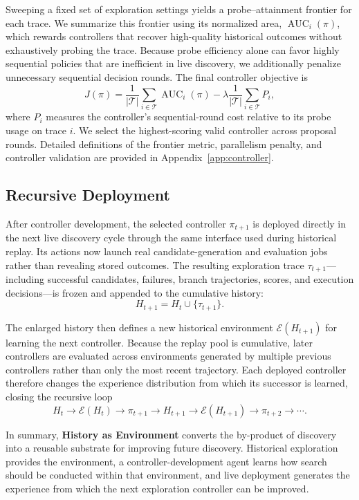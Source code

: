 Sweeping a fixed set of exploration settings yields a probe--attainment
frontier for each trace. We summarize this frontier using its normalized area,
$\operatorname{AUC}_i(\pi)$, which rewards controllers that recover high-quality
historical outcomes without exhaustively probing the trace. Because probe
efficiency alone can favor highly sequential policies that are inefficient in
live discovery, we additionally penalize unnecessary sequential decision
rounds. The final controller objective is
\begin{equation}
    J(\pi)
    =
    \frac{1}{|\mathcal{T}|}
    \sum_{i\in\mathcal{T}}
    \operatorname{AUC}_i(\pi)
    -
    \lambda
    \frac{1}{|\mathcal{T}|}
    \sum_{i\in\mathcal{T}}
    P_i,
    \label{eq:controller-objective}
\end{equation}
where $P_i$ measures the controller's sequential-round cost relative to its
probe usage on trace $i$. We select the highest-scoring valid controller across
proposal rounds. Detailed definitions of the frontier metric, parallelism
penalty, and controller validation are provided in Appendix~\ref{app:controller}.


\subsection{Recursive Deployment}
\label{sec:recursive-deployment}

After controller development, the selected controller $\pi_{t+1}$ is deployed
directly in the next live discovery cycle through the same interface used
during historical replay. Its actions now launch real candidate-generation and
evaluation jobs rather than revealing stored outcomes. The resulting
exploration trace $\tau_{t+1}$---including successful candidates, failures,
branch trajectories, scores, and execution decisions---is frozen and appended
to the cumulative history:
\begin{equation}
    H_{t+1}
    =
    H_t \cup \{\tau_{t+1}\}.
\end{equation}

The enlarged history then defines a new historical environment
$\mathcal{E}(H_{t+1})$ for learning the next controller. Because the replay pool
is cumulative, later controllers are evaluated across environments generated
by multiple previous controllers rather than only the most recent trajectory.
Each deployed controller therefore changes the experience distribution from
which its successor is learned, closing the recursive loop
\begin{equation}
    H_t
    \rightarrow
    \mathcal{E}(H_t)
    \rightarrow
    \pi_{t+1}
    \rightarrow
    H_{t+1}
    \rightarrow
    \mathcal{E}(H_{t+1})
    \rightarrow
    \pi_{t+2}
    \rightarrow \cdots .
\end{equation}

In summary, \textbf{History as Environment} converts the by-product of
discovery into a reusable substrate for improving future discovery. Historical
exploration provides the environment, a controller-development agent learns
how search should be conducted within that environment, and live deployment
generates the experience from which the next exploration controller can be
improved.